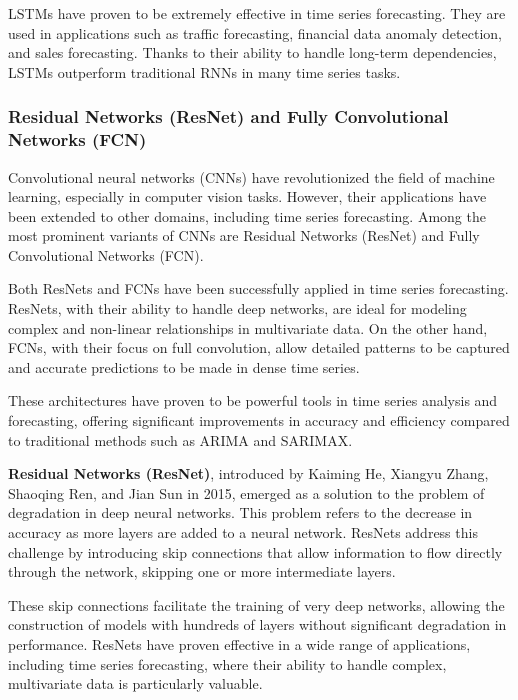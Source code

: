 LSTMs have proven to be extremely effective in time series forecasting. They are used in applications such as traffic forecasting, financial data anomaly detection, and sales forecasting. Thanks to their ability to handle long-term dependencies, LSTMs outperform traditional RNNs in many time series tasks.
\vspace{10pt}

\subsubsection{Residual Networks (ResNet) and Fully Convolutional Networks (FCN)}
Convolutional neural networks (CNNs) have revolutionized the field of machine learning, especially in computer vision tasks. However, their applications have been extended to other domains, including time series forecasting. Among the most prominent variants of CNNs are Residual Networks (ResNet) and Fully Convolutional Networks (FCN).

Both ResNets and FCNs have been successfully applied in time series forecasting. ResNets, with their ability to handle deep networks, are ideal for modeling complex and non-linear relationships in multivariate data. On the other hand, FCNs, with their focus on full convolution, allow detailed patterns to be captured and accurate predictions to be made in dense time series.

These architectures have proven to be powerful tools in time series analysis and forecasting, offering significant improvements in accuracy and efficiency compared to traditional methods such as ARIMA and SARIMAX.
\vspace{10pt}

\textbf{Residual Networks (ResNet)}, introduced by Kaiming He, Xiangyu Zhang, Shaoqing Ren, and Jian Sun in 2015, emerged as a solution to the problem of degradation in deep neural networks. This problem refers to the decrease in accuracy as more layers are added to a neural network. ResNets address this challenge by introducing skip connections that allow information to flow directly through the network, skipping one or more intermediate layers.

These skip connections facilitate the training of very deep networks, allowing the construction of models with hundreds of layers without significant degradation in performance. ResNets have proven effective in a wide range of applications, including time series forecasting, where their ability to handle complex, multivariate data is particularly valuable.
\vspace{10pt}

